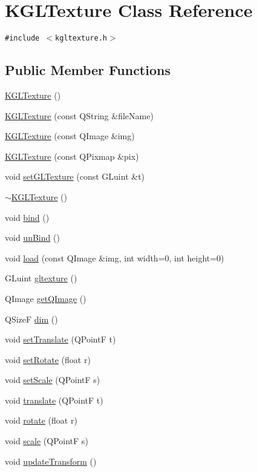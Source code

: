 \hypertarget{class_k_g_l_texture}{
\section{KGLTexture Class Reference}
\label{class_k_g_l_texture}
}
{\tt \#include $<$kgltexture.h$>$}

\subsection*{Public Member Functions}
\begin{CompactItemize}
\item 
\hyperlink{class_k_g_l_texture_36b9b3b9bdaeb08e62886b2bf573a41d}{KGLTexture} ()
\item 
\hyperlink{class_k_g_l_texture_c03f57e6b9a2eeefe61011150a4d86ae}{KGLTexture} (const QString \&fileName)
\item 
\hyperlink{class_k_g_l_texture_48c33d3bc28adcc229c8fee5b96c887d}{KGLTexture} (const QImage \&img)
\item 
\hyperlink{class_k_g_l_texture_14a6af5eb6b31f6ce1fad224fdfe828f}{KGLTexture} (const QPixmap \&pix)
\item 
void \hyperlink{class_k_g_l_texture_4f144c01153ec97b0a7e4f457ebe8f06}{setGLTexture} (const GLuint \&t)
\item 
\hyperlink{class_k_g_l_texture_c4b477f122904517bd16cc6d55e9a5e3}{$\sim$KGLTexture} ()
\item 
void \hyperlink{class_k_g_l_texture_ca185912b1f981310404c4be89dd9d52}{bind} ()
\item 
void \hyperlink{class_k_g_l_texture_27e01b57c2af3331eb0295a4ba38bc9c}{unBind} ()
\item 
void \hyperlink{class_k_g_l_texture_7526a64329b83b21af1908860a9f1c0d}{load} (const QImage \&img, int width=0, int height=0)
\item 
GLuint \hyperlink{class_k_g_l_texture_f6699b639b1c5b5c8ba71040961a1ac3}{gltexture} ()
\item 
QImage \hyperlink{class_k_g_l_texture_d8819075431c2c07c4e606565a072a8d}{getQImage} ()
\item 
QSizeF \hyperlink{class_k_g_l_texture_0ce53b8e563c610c0611c7635f885049}{dim} ()
\item 
void \hyperlink{class_k_g_l_texture_7af343304d1b4abf0409e79486aeaa28}{setTranslate} (QPointF t)
\item 
void \hyperlink{class_k_g_l_texture_80402ae0c478ae9186747fb6f7b1a0b0}{setRotate} (float r)
\item 
void \hyperlink{class_k_g_l_texture_dc79d610ddba188a39f4072e8ab9d274}{setScale} (QPointF s)
\item 
void \hyperlink{class_k_g_l_texture_10abdae695fa96ced2ea46a873c6f058}{translate} (QPointF t)
\item 
void \hyperlink{class_k_g_l_texture_638e961fda83c028eb6b9295d1298fdc}{rotate} (float r)
\item 
void \hyperlink{class_k_g_l_texture_4a7059c7c0001c7d758b9bbb91d71525}{scale} (QPointF s)
\item 
void \hyperlink{class_k_g_l_texture_67cf0613953a0d7949e85f39c30d2594}{updateTransform} ()
\end{CompactItemize}
